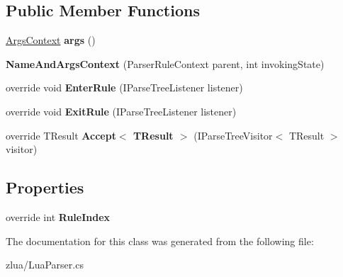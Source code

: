 \subsection*{Public Member Functions}
\begin{DoxyCompactItemize}
\item 
\mbox{\label{classzlua_1_1_lua_parser_1_1_name_and_args_context_aae2881a7abb53bd8079de2408fdf58aa}} 
\mbox{\hyperlink{classzlua_1_1_lua_parser_1_1_args_context}{Args\+Context}} {\bfseries args} ()
\item 
\mbox{\label{classzlua_1_1_lua_parser_1_1_name_and_args_context_a7fe687880db840d9d096fbf6074bcc49}} 
{\bfseries Name\+And\+Args\+Context} (Parser\+Rule\+Context parent, int invoking\+State)
\item 
\mbox{\label{classzlua_1_1_lua_parser_1_1_name_and_args_context_aa5502a302159dc33aedc627e4ca19646}} 
override void {\bfseries Enter\+Rule} (I\+Parse\+Tree\+Listener listener)
\item 
\mbox{\label{classzlua_1_1_lua_parser_1_1_name_and_args_context_a4fb54caae27f07d171516a53198cfa28}} 
override void {\bfseries Exit\+Rule} (I\+Parse\+Tree\+Listener listener)
\item 
\mbox{\label{classzlua_1_1_lua_parser_1_1_name_and_args_context_a1796d0a52e9bf147168ebe7c8908190e}} 
override T\+Result {\bfseries Accept$<$ T\+Result $>$} (I\+Parse\+Tree\+Visitor$<$ T\+Result $>$ visitor)
\end{DoxyCompactItemize}
\subsection*{Properties}
\begin{DoxyCompactItemize}
\item 
\mbox{\label{classzlua_1_1_lua_parser_1_1_name_and_args_context_a74443002b5be5f421245ea3f93a6b729}} 
override int {\bfseries Rule\+Index}
\end{DoxyCompactItemize}


The documentation for this class was generated from the following file\+:\begin{DoxyCompactItemize}
\item 
zlua/Lua\+Parser.\+cs\end{DoxyCompactItemize}
